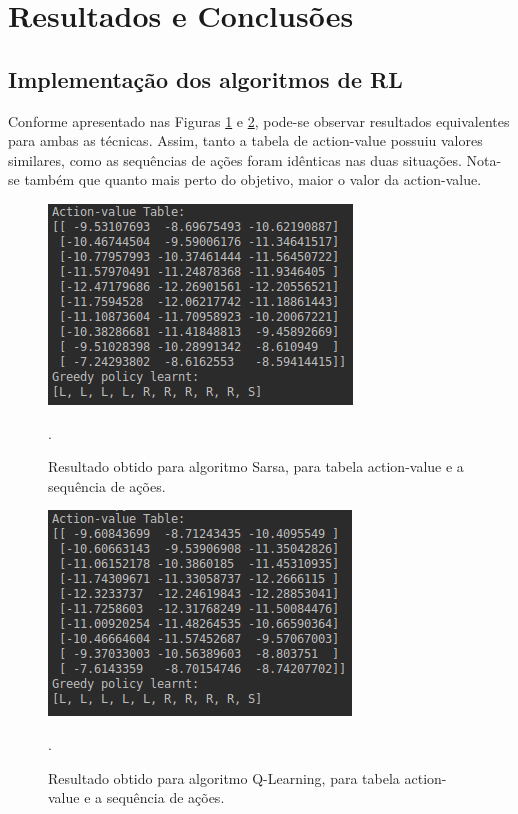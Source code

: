 \documentclass[conference]{IEEEtran}
\begin{document}
\section{Resultados e Conclusões}

\subsection{Implementação dos algoritmos de RL}

Conforme apresentado nas Figuras \ref{sarsa_test_rl} e \ref{qlearning_test_rl}, pode-se observar resultados equivalentes para ambas as técnicas. Assim, tanto a tabela de action-value possuiu valores similares, como as sequências de ações foram idênticas nas duas situações. Nota-se também que quanto mais perto do objetivo, maior o valor da action-value.

\begin{figure}[htbp]
\centering
\centerline{\includegraphics[scale=0.5]{imagens/sarsa_test_rl.png}}
\caption{Resultado obtido para algoritmo Sarsa, para tabela action-value e a sequência de ações.}.
\label{sarsa_test_rl}
\end{figure}

\begin{figure}[htbp]
\centering
\centerline{\includegraphics[scale=0.5]{imagens/qlearning_test_rl.png}}
\caption{Resultado obtido para algoritmo Q-Learning, para tabela action-value e a sequência de ações.}.
\label{qlearning_test_rl}
\end{figure} 
\end{document}
